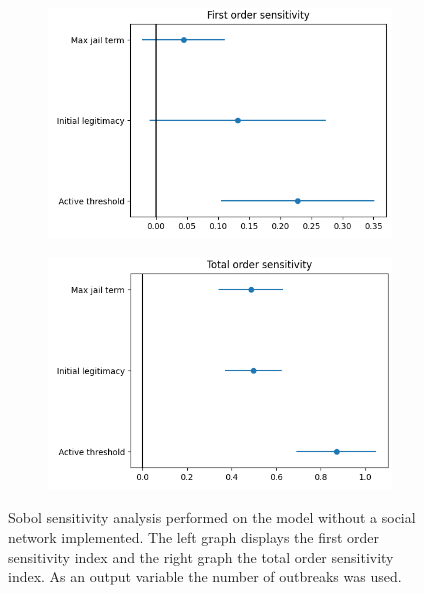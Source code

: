 \documentclass[10pt]{article}
\begin{document}
    \begin{figure}[h!]
        \centering
        \begin{subfigure}[b]{.45\linewidth}
            \includegraphics[width=\textwidth]{pictures/Sensitivity_analysis/Global SA_first2.png}
            \label{fig:global_sa_first order}
        \end{subfigure}
        \begin{subfigure}[b]{.45\linewidth}
            \includegraphics[width=\textwidth]{pictures/Sensitivity_analysis/Global SA_total2.png}
            \label{fig:to_SA}
        \end{subfigure}
        \captionsetup{width=0.9\linewidth}
        \caption{Sobol sensitivity analysis performed on the model without a social network implemented. The left graph displays the first order sensitivity index and the right graph the total order sensitivity index. As an output variable the number of outbreaks was used.}
        \label{fig:global_sa}
    \end{figure}
\end{document}
